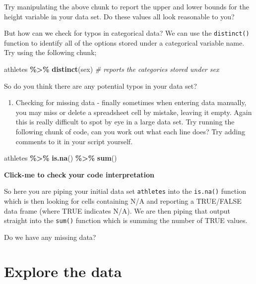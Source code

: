 \documentclass[
]{book}
\newenvironment{Shaded}{\begin{snugshade}}{\end{snugshade}}
\newcommand{\CommentTok}[1]{\textcolor[rgb]{0.56,0.35,0.01}{\textit{#1}}}
\newcommand{\FunctionTok}[1]{\textcolor[rgb]{0.13,0.29,0.53}{\textbf{#1}}}
\newcommand{\NormalTok}[1]{#1}
\newcommand{\SpecialCharTok}[1]{\textcolor[rgb]{0.81,0.36,0.00}{\textbf{#1}}}
\providecommand{\tightlist}{%
  \setlength{\itemsep}{0pt}\setlength{\parskip}{0pt}}
\begin{document}
Try manipulating the above chunk to report the upper and lower bounds for the height variable in your data set. Do these values all look reasonable to you?

But how can we check for typos in categorical data? We can use the \texttt{distinct()} function to identify all of the options stored under a categorical variable name. Try using the following chunk;

\begin{Shaded}
\begin{Highlighting}[]
\NormalTok{athletes }\SpecialCharTok{\%\textgreater{}\%} 
  \FunctionTok{distinct}\NormalTok{(sex) }\CommentTok{\# reports the categories stored under sex}
\end{Highlighting}
\end{Shaded}

So do you think there are any potential typos in your data set?

\begin{enumerate}
\def\labelenumi{\arabic{enumi})}
\setcounter{enumi}{2}
\tightlist
\item
  Checking for missing data - finally sometimes when entering data manually, you may miss or delete a spreadsheet cell by mistake, leaving it empty. Again this is really difficult to spot by eye in a large data set. Try running the following chunk of code, can you work out what each line does? Try adding comments to it in your script yourself.
\end{enumerate}

\begin{Shaded}
\begin{Highlighting}[]
\NormalTok{athletes }\SpecialCharTok{\%\textgreater{}\%} 
  \FunctionTok{is.na}\NormalTok{() }\SpecialCharTok{\%\textgreater{}\%} 
  \FunctionTok{sum}\NormalTok{()}
\end{Highlighting}
\end{Shaded}

\textbf{Click-me to check your code interpretation}

So here you are piping your initial data set \texttt{athletes} into the \texttt{is.na()} function which is then looking for cells containing N/A and reporting a TRUE/FALSE data frame (where TRUE indicates N/A). We are then piping that output straight into the \texttt{sum()} function which is summing the number of TRUE values.

Do we have any missing data?

\hypertarget{explore-the-data}{%
\section{Explore the data}\label{explore-the-data}}
\end{document}
